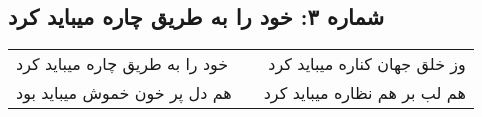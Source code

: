 \begin{center}
\section*{شماره ۳: خود را به طریق چاره میباید کرد}
\label{sec:003}
\begin{longtable}{l p{0.5cm} r}
خود را به طریق چاره میباید کرد
&&
وز خلق جهان کناره میباید کرد
\\
هم دل پر خون خموش میباید بود
&&
هم لب بر هم نظاره میباید کرد
\\
\end{longtable}
\end{center}
